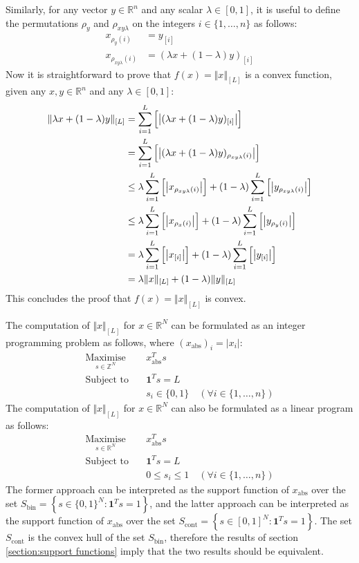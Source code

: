 Similarly, for any vector $y\in\mathbb{R}^n$ and any scalar $\lambda\in[0, 1]$, it is useful to define the permutations $\rho_y$ and $\rho_{xy\lambda}$ on the integers $i\in\{1,\hdots,n\}$ as follows:
\begin{align*}
    x_{\rho_y(i)} &= y_{[i]} \\
    x_{\rho_{xy\lambda}(i)} &= (\lambda x + (1 - \lambda)y)_{[i]}
\end{align*}
Now it is straightforward to prove that $f(x) = \Vert x \Vert_{[L]}$ is a convex function, given any $x, y\in\mathbb{R}^n$ and any $\lambda\in[0, 1]$:
\begin{align*}
    \Vert \lambda x + (1 - \lambda)y \Vert_{[L]} &= \sum_{i=1}^L{\Bigl[ \left\vert (\lambda x + (1 - \lambda)y)_{[i]} \right\vert \Bigr]} \\
    &= \sum_{i=1}^L{\Bigl[ \left\vert (\lambda x + (1 - \lambda)y)_{\rho_{xy\lambda}(i)} \right\vert \Bigr]} \\
    &\le \lambda\sum_{i=1}^L{\Bigl[ \left\vert x_{\rho_{xy\lambda}(i)} \right\vert \Bigr]} + (1 - \lambda)\sum_{i=1}^L{\Bigl[ \left\vert y_{\rho_{xy\lambda}(i)} \right\vert \Bigr]} \\
    &\le \lambda\sum_{i=1}^L{\Bigl[ \left\vert x_{\rho_x(i)} \right\vert \Bigr]} + (1 - \lambda)\sum_{i=1}^L{\Bigl[ \left\vert y_{\rho_y(i)} \right\vert \Bigr]} \\
    &= \lambda\sum_{i=1}^L{\Bigl[ \left\vert x_{[i]} \right\vert \Bigr]} + (1 - \lambda)\sum_{i=1}^L{\Bigl[ \left\vert y_{[i]} \right\vert \Bigr]} \\
    &= \lambda\Vert x \Vert_{[L]} + (1 - \lambda)\Vert y \Vert_{[L]}
\end{align*}
This concludes the proof that $f(x) = \Vert x \Vert_{[L]}$ is convex.

The computation of $\Vert x \Vert_{[L]}$ for $x\in\mathbb{R}^N$ can be formulated as an integer programming problem as follows, where $(x_\text{abs})_i = \vert x_i \vert$:
\begin{align*}
    \underset{s\in\mathbb{Z}^N}{\text{Maximise}} \quad & x_\text{abs}^T s \\
    \text{Subject to} \quad & \mathbf{1}^Ts = L \\
    & s_i\in\{0, 1\} \quad (\forall i\in\{1, \hdots, n\})
\end{align*}
The computation of $\Vert x \Vert_{[L]}$ for $x\in\mathbb{R}^N$ can also be formulated as a linear program as follows:
\begin{align*}
    \underset{s\in\mathbb{R}^N}{\text{Maximise}} \quad & x_\text{abs}^T s \\
    \text{Subject to} \quad & \mathbf{1}^Ts = L \\
    & 0 \le s_i \le 1 \quad (\forall i\in\{1, \hdots, n\})
\end{align*}
The former approach can be interpreted as the support function of $x_\text{abs}$ over the set $S_\text{bin} = \left\{ s\in\{0,1\}^N:\mathbf{1}^T s = 1 \right\}$, and the latter approach can be interpreted as the support function of $x_\text{abs}$ over the set $S_\text{cont} = \left\{ s\in[0,1]^N:\mathbf{1}^T s = 1 \right\}$. The set $S_\text{cont}$ is the convex hull of the set $S_\text{bin}$, therefore the results of section \ref{section:support functions} imply that the two results should be equivalent.
